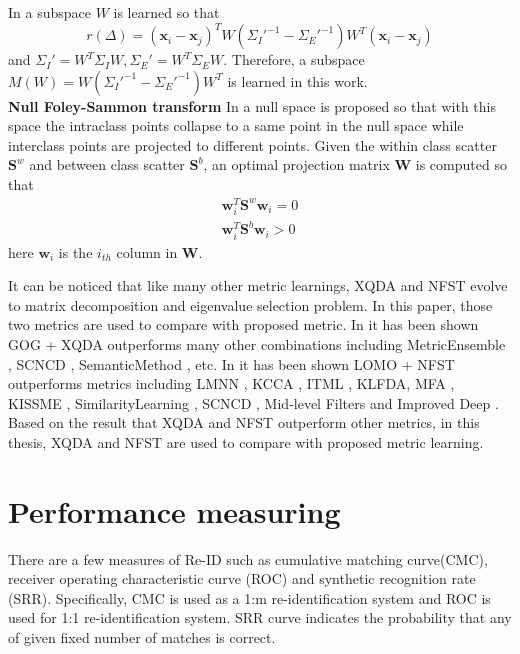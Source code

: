 In \cite{LOMO} a subspace $W$ is learned so that 
\begin{equation}
r(\Delta) = (\bm{x}_i - \bm{x}_j)^TW({\Sigma_I}'^{-1} - {\Sigma_E}'^{-1})W^T(\bm{x}_i - \bm{x}_j)
\end{equation}
and ${\Sigma_I}' = W^T\Sigma_IW, {\Sigma_E}' = W^T\Sigma_EW$. Therefore, a subspace $M(W) = W({\Sigma_I}'^{-1} - {\Sigma_E}'^{-1})W^T$ is learned in this work.\\
\indent \textbf{Null Foley-Sammon transform} In \cite{NFST} a null space is proposed so that with this space the intraclass points collapse to a same point in the null space while interclass points are projected to different points. Given the within class scatter $\bm{S}^w$ and between class scatter $\bm{S}^b$, an optimal projection matrix $\bm{W}$ is computed so that 
\begin{equation}
\begin{aligned}
\bm{w}_i^T\bm{S}^w\bm{w}_i = 0\\
\bm{w}_i^T\bm{S}^b\bm{w}_i > 0
\end{aligned}
\end{equation}
here $\bm{w}_i$ is the $i_{th}$ column in $\bm{W}$.

It can be noticed that like many other metric learnings, XQDA and NFST evolve to matrix decomposition and eigenvalue selection problem. In this paper, those two metrics are used to compare with proposed metric. In \cite{GOG} it has been shown GOG + XQDA outperforms many other combinations including MetricEnsemble \cite{MetricEnsembles}, SCNCD \cite{SCNCD}, SemanticMethod \cite{SemanticMethod}, etc. In \cite{ NFST} it has been shown LOMO + NFST outperforms metrics including LMNN \cite{LMNN}, KCCA \cite{KCCA}, ITML \cite{ITML}, KLFDA\cite{KLFDA}, MFA \cite{KernelVersionMetrics}, KISSME \cite{KISSME}, SimilarityLearning \cite{SimilarityLearning}, SCNCD \cite{SCNCD}, Mid-level Filters \cite{MidlevelFilters} and Improved Deep \cite{ImprovedCNN}. Based on the result that XQDA and NFST outperform other metrics, in this thesis, XQDA and NFST are used to compare with proposed metric learning. 

\section{Performance measuring}
There are a few measures of Re-ID such as cumulative matching curve(CMC), receiver operating characteristic curve (ROC) and synthetic recognition rate (SRR). Specifically, CMC is used as a 1:m re-identification system and ROC is used for 1:1 re-identification system. SRR curve indicates the probability that any of given fixed number of matches is correct.

